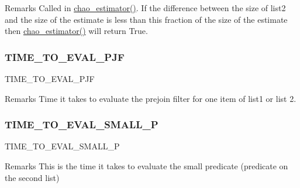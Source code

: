 \begin{DoxyRemark}{Remarks}
Called in \mbox{\hyperlink{classdynamicfilterapp_1_1models_1_1_join_a582efaf16c8455e890ef61101a863966}{chao\+\_\+estimator()}}. If the difference between the size of list2 and the size of the estimate is less than this fraction of the size of the estimate then \mbox{\hyperlink{classdynamicfilterapp_1_1models_1_1_join_a582efaf16c8455e890ef61101a863966}{chao\+\_\+estimator()}} will return True. 
\end{DoxyRemark}
\mbox{\label{classdynamicfilterapp_1_1models_1_1_join_aa0876e973360936f4052e3b837e3933f}} 
\subsubsection{\texorpdfstring{TIME\_TO\_EVAL\_PJF}{TIME\_TO\_EVAL\_PJF}}
{\footnotesize\ttfamily T\+I\+M\+E\+\_\+\+T\+O\+\_\+\+E\+V\+A\+L\+\_\+\+P\+JF}

\begin{DoxyRemark}{Remarks}
Time it takes to evaluate the prejoin filter for one item of list1 or list 2. 
\end{DoxyRemark}
\mbox{\label{classdynamicfilterapp_1_1models_1_1_join_aa18e8aadd97714397358bc349089d8db}} 
\subsubsection{\texorpdfstring{TIME\_TO\_EVAL\_SMALL\_P}{TIME\_TO\_EVAL\_SMALL\_P}}
{\footnotesize\ttfamily T\+I\+M\+E\+\_\+\+T\+O\+\_\+\+E\+V\+A\+L\+\_\+\+S\+M\+A\+L\+L\+\_\+P}

\begin{DoxyRemark}{Remarks}
This is the time it takes to evaluate the small predicate (predicate on the second list) 
\end{DoxyRemark}
\mbox{\label{classdynamicfilterapp_1_1models_1_1_join_a76d6a2f259d803ee6a381876fbb054d6}} 
